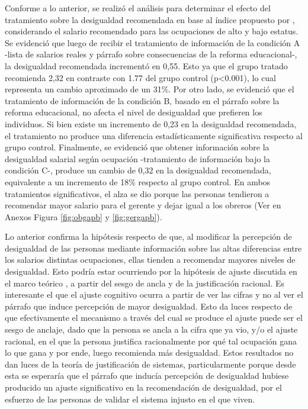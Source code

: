 \documentclass[12pt]{article}
\begin{document}
Conforme a lo anterior, se realizó el análisis para determinar el efecto del tratamiento sobre la desigualdad recomendada en base al índice propuesto por \cite{Jasso1999}, considerando el salario recomendado para las ocupaciones de alto y bajo estatus. Se evidenció que luego de recibir el tratamiento de información de la condición A -lista de salarios reales y párrafo sobre consecuencias de la reforma educacional-, la desigualdad recomendada incrementó en 0,55. Esto ya que el grupo tratado recomienda 2,32 en contraste con 1.77 del grupo control (p<0.001), lo cual representa un cambio aproximado de un 31\%. Por otro lado, se evidenció que el tratamiento de información de la condición B, basado en el párrafo sobre la reforma educacional, no afecta el nivel de desigualdad que prefieren los individuos. Si bien existe un incremento de 0,23 en la desigualdad recomendada, el tratamiento no produce una diferencia estadísticamente significativa respecto al grupo control. Finalmente, se evidenció que obtener información sobre la desigualdad salarial según ocupación -tratamiento de información bajo la condición C-, produce un cambio de 0,32 en la desigualdad recomendada, equivalente a un incremento de 18\% respecto al grupo control. En ambos tratamientos significativos, el alza se dio porque las personas tendieron a recomendar mayor salario para el gerente y dejar igual a los obreros (Ver en Anexos Figura \ref{fig:obgapb} y \ref{fig:gergapb}). 

Lo anterior confirma la hipótesis respecto de que, al modificar la percepción de desigualdad de las personas mediante información sobre las altas diferencias entre los salarios distintas ocupaciones, ellas tienden a recomendar mayores niveles de desigualdad. Esto podría estar ocurriendo por la hipótesis de ajuste discutida en el marco teórico  \citep{Trump2017}, a partir del sesgo de ancla y de la justificación racional. Es interesante el que el ajuste cognitivo ocurra a partir de ver las cifras y no al ver el párrafo que induce percepción de mayor desigualdad. Esto da luces respecto de que efectivamente el mecanismo a través del cual se produce el ajuste puede ser el sesgo de anclaje, dado que la persona se ancla a la cifra que ya vio, y/o el ajuste racional, en el que la persona justifica racionalmente por qué tal ocupación gana lo que gana y por ende, luego recomienda más desigualdad. Estos resultados no dan luces de la teoría de justificación de sistemas, particularmente porque desde esta se esperaría que el párrafo que inducía percepción de desigualdad hubiese producido un ajuste significativo en la recomendación de desigualdad, por el esfuerzo de las personas de validar el sistema injusto en el que viven. 
\end{document}
